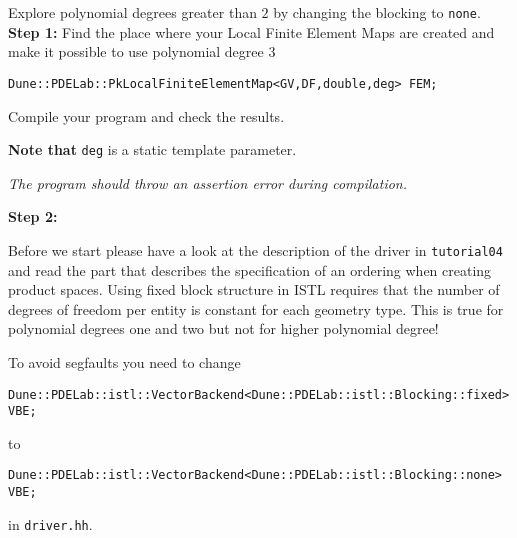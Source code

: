 \documentclass[12pt,a4paper]{article}
\begin{document}
\begin{Exercise}{Explore polynomial degrees greater than $2$ by
    changing the blocking to \lstinline{none}.}
  \textbf{Step 1:} Find the place where your Local Finite Element Maps
  are created and make it possible to use polynomial degree 3

  \begin{lstlisting}
Dune::PDELab::PkLocalFiniteElementMap<GV,DF,double,deg> FEM;
  \end{lstlisting}

  Compile your program and check the results.

  \textbf{Note that} \lstinline!deg! is a static template parameter.

  \textit{The program should throw an assertion error during compilation.}

  \textbf{Step 2:}

  Before we start please have a look at the description of the driver
  in \lstinline!tutorial04! and read the part that describes the
  specification of an ordering when creating product spaces. Using
  fixed block structure in ISTL requires that the number of degrees of
  freedom per entity is constant for each geometry type. This is true
  for polynomial degrees one and two but not for higher polynomial
  degree!

  To avoid segfaults you need to change
  \begin{lstlisting}
Dune::PDELab::istl::VectorBackend<Dune::PDELab::istl::Blocking::fixed> VBE;
  \end{lstlisting}
  to
  \begin{lstlisting}
Dune::PDELab::istl::VectorBackend<Dune::PDELab::istl::Blocking::none> VBE;
  \end{lstlisting}
  in  \lstinline!driver.hh!.
\end{Exercise}
\end{document}
